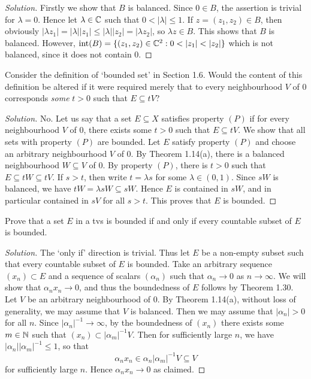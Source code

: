 \begin{proof}[Solution]
	Firstly we show that $B$ is balanced. Since $0 \in B$, the assertion is trivial for $\lambda=0$. Hence let $\lambda \in \mathbb{C}$ such that $0 < |\lambda| \le 1$. If $z = (z_1, z_2) \in B$, then obviously $|\lambda z_1| = |\lambda||z_1| \le |\lambda| |z_2| = |\lambda z_2|$, so $\lambda z \in B$. This shows that $B$ is balanced. However, $\text{int}(B) = \{ (z_1,z_2) \in \CC^2 : 0<|z_1|<|z_2|\}$ which is not balanced, since it does not contain 0.
\end{proof}

\begin{exercise}
	Consider the definition of `bounded set' in Section 1.6. Would the content of this definition be altered if it were required merely that to every neighbourhood $V$ of 0 corresponds \emph{some} $t>0$ such that $E \subseteq tV$?
\end{exercise}

\begin{proof}[Solution]
	No. Let us say that a set $E \subseteq X$ satisfies property $(P)$ if for every neighbourhood $V$ of 0, there exists some $t>0$ such that $E \subseteq tV$. We show that all sets with property $(P)$ are bounded. Let $E$ satisfy property $(P)$ and choose an arbitrary neighbourhood $V$ of 0. By Theorem 1.14(a), there is a balanced neighbourhood $W \subseteq V$ of 0. By property $(P)$, there is $t>0$ such that $E \subseteq tW \subseteq tV$. If $s>t$, then write $t = \lambda s$ for some $\lambda \in (0,1)$. Since $sW$ is balanced, we have $tW = \lambda sW \subseteq sW$. Hence $E$ is contained in $sW$, and in particular contained in $sV$ for all $s>t$. This proves that $E$ is bounded.
\end{proof}

\begin{exercise}
	Prove that a set $E$ in a tvs is bounded if and only if every countable subset of $E$ is bounded.
\end{exercise}

\begin{proof}[Solution]
	The `only if' direction is trivial. Thus let $E$ be a non-empty subset such that every countable subset of $E$ is bounded. Take an arbitrary sequence $(x_n) \subset E$ and a sequence of scalars $(\alpha_n)$ such that $\alpha_n \to 0$ as $n \to \infty$. We will show that $\alpha_n x_n \to 0$, and thus the boundedness of $E$ follows by Theorem 1.30. Let $V$ be an arbitrary neighbourhood of 0. By Theorem 1.14(a), without loss of generality, we may assume that $V$ is balanced. Then we may assume that $|\alpha_n| >0$ for all $n$. Since $|\alpha_n|^{-1} \to \infty$, by the boundedness of $(x_n)$ there exists some $m \in \mathbb{N}$ such that $(x_n) \subset |\alpha_m|^{-1}V$. Then for sufficiently large $n$, we have $|\alpha_n||\alpha_m|^{-1} \le 1$, so that
	\begin{equation*}
		\alpha_n x_n \in \alpha_n |\alpha_m|^{-1}V \subseteq V
	\end{equation*}
	for sufficiently large $n$. Hence $\alpha_n x_n \to 0$ as claimed.
\end{proof}

